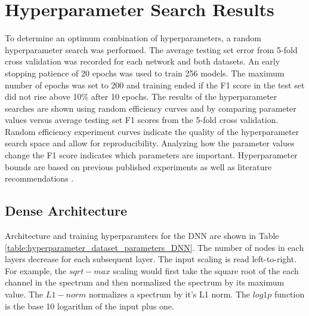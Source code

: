 \section{Hyperparameter Search Results}

To determine an optimum combination of hyperparameters, a random hyperparameter search was performed. The average testing set error from 5-fold cross validation was recorded for each network and both datasets. An early stopping patience of 20 epochs was used to train 256 models. The maximum number of epochs was set to 200 and training ended if the F1 score in the test set did not rise above 10$\%$ after 10 epochs. The results of the hyperparameter searches are shown using random efficiency curves and by comparing parameter values versus average testing set F1 scores from the 5-fold cross validation. Random efficiency experiment curves indicate the quality of the hyperparameter search space and allow for reproducibility. Analyzing how the parameter values change the F1 score indicates which parameters are important. Hyperparameter bounds are based on previous published experiments as well as literature recommendations \cite{kamuda2017, kamuda2018, Bengio2018}.





\subsection{Dense Architecture}

Architecture and training hyperparamters for the DNN are shown in Table \ref{table:hyperparameter_dataset_parameters_DNN}. The number of nodes in each layers decrease for each subsequent layer. The input scaling is read left-to-right. For example, the $sqrt-max$ scaling would first take the square root of the each channel in the spectrum and then normalized the spectrum by its maximum value. The $L1-norm$ normalizes a spectrum by it's L1 norm. The $log1p$ function is the base 10 logarithm of the input plus one.

